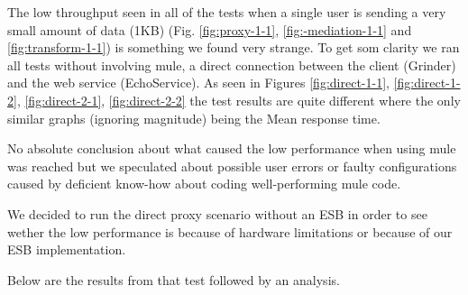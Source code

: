 The low throughput seen in all of the tests when a single user is sending a very small amount of data (1KB) (Fig. \ref{fig:proxy-1-1}, \ref{fig:-mediation-1-1} and \ref{fig:transform-1-1}) is something we found very strange.
To get som clarity we ran all tests without involving mule, a direct connection between the client (Grinder) and the web service (EchoService). As seen in Figures \ref{fig:direct-1-1}, \ref{fig:direct-1-2}, \ref{fig:direct-2-1}, \ref{fig:direct-2-2} the test results are quite different where the only similar graphs (ignoring magnitude) being the Mean response time.

No absolute conclusion about what caused the low performance when using mule was reached but we speculated about possible user errors or faulty configurations caused by deficient know-how about coding well-performing mule code.

We decided to run the direct proxy scenario without an ESB in order to see wether the low performance is because of hardware limitations or because of our ESB implementation.

Below are the results from that test followed by an analysis.

\newpage

